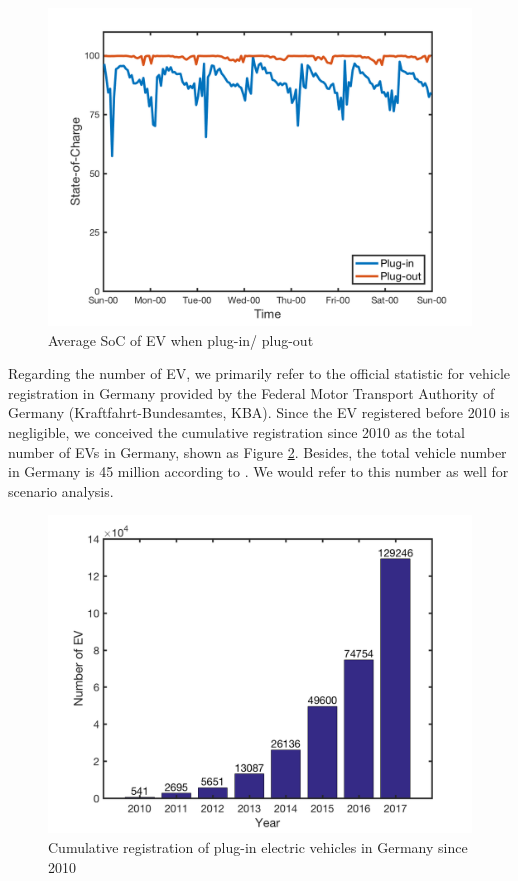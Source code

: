 \begin{figure}[h!]
	\centering
	\includegraphics[width=0.8\linewidth]{Figures/Data_SoC}
	\caption{Average SoC of EV when plug-in/ plug-out}
	\label{fig:data-soc}
\end{figure}

Regarding the number of EV, we primarily refer to the official statistic for vehicle registration in Germany provided by the Federal Motor Transport Authority of Germany (Kraftfahrt-Bundesamtes, KBA)\cite{KBA2017}. Since the EV registered before 2010 is negligible, we conceived the cumulative registration since 2010 as the total number of EVs in Germany, shown as Figure \ref{fig:Germany_EV_number}. Besides, the total vehicle number in Germany is 45 million according to \cite{Eurostat_de_v}. We would refer to this number as well for scenario analysis.

\begin{figure}[h!]
	\centering
	\includegraphics[width=0.95\linewidth]{Figures/Germany_EV_number}
	\caption{Cumulative registration of plug-in electric vehicles in Germany since 2010 \cite{KBA2017}}
	\label{fig:Germany_EV_number}
\end{figure}

